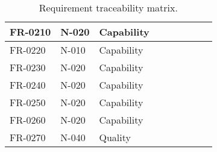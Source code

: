 \begin{sidewaystable}
\begin{table}[H]
\begin{tabular}{|p{2cm}|p{2cm}|p{3cm}|p{2cm}|p{2cm}|p{2cm}|p{2cm}|p{2cm}|p{2cm}|}
 FR-0210 & N-020 & Capability & & & & & &\\ \hline
 FR-0220 & N-010 & Capability & & & & & &\\ \hline
 FR-0230 & N-020 & Capability & & & & & &\\ \hline
 FR-0240 & N-020 & Capability & & & & & &\\ \hline
 FR-0250 & N-020 & Capability & & & & & &\\ \hline
 FR-0260 & N-020 & Capability & & & & & &\\ \hline
 FR-0270 & N-040 & Quality    & & & & & &\\ \hline
\end{tabular}	
\caption{Requirement traceability matrix.}
\end{table}






\end{sidewaystable}